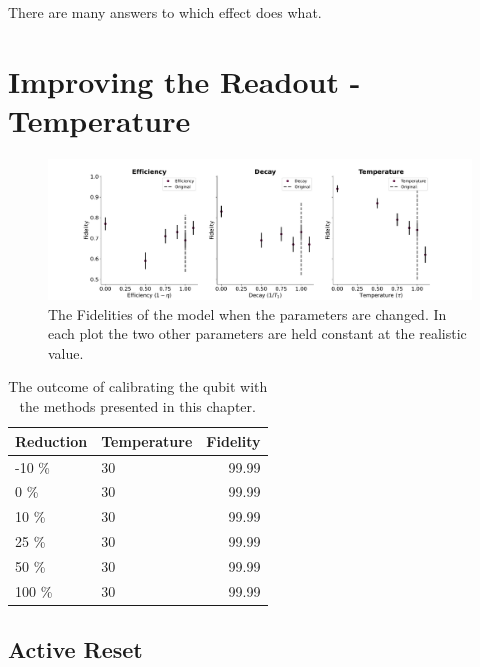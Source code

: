 There are many answers to which effect does what.

\section{Improving the Readout - Temperature}

\begin{figure}
    \centering
    \includegraphics[width = \textwidth]{Simulations/budgets/figures/fidelities_at_different_parameters.pdf}
    \caption{The Fidelities of the model when the parameters are changed. In each plot the two other parameters are held constant at the realistic value.}
    \label{fig:scan_of_fidelities_at_different_parameters}
\end{figure}

\begin{table}[h]
\centering
\caption{The outcome of calibrating the qubit with the methods presented in this chapter.}
\begin{tabular}{ll|r}
\hline
\textbf{Reduction}        & Temperature                  & Fidelity\\ \hline
-10 \%                     &  30                         &  99.99\\
0   \%                     &  30                         &  99.99\\
10  \%                     &  30                         &  99.99\\
25  \%                     &  30                         &  99.99\\
50  \%                     &  30                         &  99.99\\
100 \%                     &  30                         &  99.99\\
\end{tabular}
\label{tab:readout_infidelity_contribution_estimation}
\end{table}


\subsection{Active Reset}

